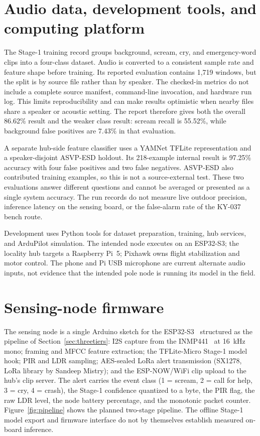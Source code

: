 \documentclass[12pt,a4paper]{report}
\begin{document}
\section{Audio data, development tools, and computing platform}
\label{sec:data-platform}

The Stage-1 training record groups background, scream, cry, and
emergency-word clips into a four-class dataset. Audio is converted to
a consistent sample rate and feature shape before training. Its
reported evaluation contains 1,719 windows, but the split is by
source file rather than by speaker. The checked-in metrics do not
include a complete source manifest, command-line invocation, and
hardware run log. This limits reproducibility and can make results
optimistic when nearby files share a speaker or acoustic setting.
The report therefore gives both the overall 86.62\% result and the
weaker class result: scream recall is 55.52\%, while background
false positives are 7.43\% in that evaluation.

A separate hub-side feature classifier uses a YAMNet TFLite
representation and a speaker-disjoint ASVP-ESD holdout. Its
218-example internal result is 97.25\% accuracy with four false
positives and two false negatives. ASVP-ESD also contributed training
examples, so this is not a source-external test. These two evaluations
answer different questions and cannot be averaged or presented as a
single system accuracy. The run records do not measure live outdoor
precision, inference latency on the sensing board, or the
false-alarm rate of the KY-037 bench route.

Development uses Python tools for dataset preparation, training,
hub services, and ArduPilot simulation. The intended node executes
on an ESP32-S3; the locality hub targets a Raspberry Pi~5; Pixhawk
owns flight stabilization and motor control. The phone and Pi USB
microphone are current alternate audio inputs, not evidence that the
intended pole node is running its model in the field.

\section{Sensing-node firmware}
\label{sec:nodefirmware}

The sensing node is a single Arduino sketch for the
ESP32-S3~\cite{esp32s3} structured as the pipeline of
Section~\ref{sec:threetiers}: I2S capture from the INMP441~\cite{inmp441} at
16~kHz mono; framing and MFCC feature extraction; the TFLite-Micro
Stage-1 model hook; PIR and LDR sampling; AES-sealed LoRa alert
transmission (SX1278, LoRa library by Sandeep Mistry); and the
ESP-NOW/WiFi clip upload to the hub's clip server. The alert carries
the event class (1 = scream, 2 = call for help, 3 = cry, 4 = crash),
the Stage-1 confidence quantized to a byte, the PIR flag, the raw LDR
level, the node battery percentage, and the monotonic packet counter.
Figure~\ref{fig:pipeline} shows the planned two-stage pipeline. The
offline Stage-1 model export and firmware interface do not by
themselves establish measured on-board inference.
\end{document}
